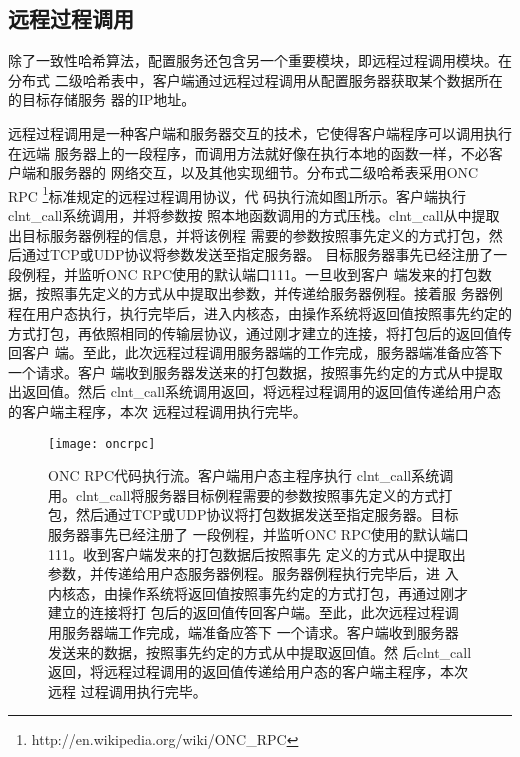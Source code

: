\subsection{远程过程调用}
除了一致性哈希算法，配置服务还包含另一个重要模块，即远程过程调用模块。在分布式
二级哈希表中，客户端通过远程过程调用从配置服务器获取某个数据所在的目标存储服务
器的IP地址。

远程过程调用是一种客户端和服务器交互的技术，它使得客户端程序可以调用执行在远端
服务器上的一段程序，而调用方法就好像在执行本地的函数一样，不必客户端和服务器的
网络交互，以及其他实现细节。分布式二级哈希表采用ONC RPC
\footnote{http://en.wikipedia.org/wiki/ONC\_RPC}标准规定的远程过程调用协议，代
码执行流如图\ref{figure:oncrpc}所示。客户端执行clnt\_call系统调用，并将参数按
照本地函数调用的方式压栈。clnt\_call从中提取出目标服务器例程的信息，并将该例程
需要的参数按照事先定义的方式打包，然后通过TCP或UDP协议将参数发送至指定服务器。
目标服务器事先已经注册了一段例程，并监听ONC RPC使用的默认端口111。一旦收到客户
端发来的打包数据，按照事先定义的方式从中提取出参数，并传递给服务器例程。接着服
务器例程在用户态执行，执行完毕后，进入内核态，由操作系统将返回值按照事先约定的
方式打包，再依照相同的传输层协议，通过刚才建立的连接，将打包后的返回值传回客户
端。至此，此次远程过程调用服务器端的工作完成，服务器端准备应答下一个请求。客户
端收到服务器发送来的打包数据，按照事先约定的方式从中提取出返回值。然后
clnt\_call系统调用返回，将远程过程调用的返回值传递给用户态的客户端主程序，本次
远程过程调用执行完毕。
\begin{figure}
  \centering
  \texttt{[image: oncrpc]}
  \caption[ONC RPC代码执行流]{ONC RPC代码执行流。客户端用户态主程序执行
  clnt\_call系统调用。clnt\_call将服务器目标例程需要的参数按照事先定义的方式打
  包，然后通过TCP或UDP协议将打包数据发送至指定服务器。目标服务器事先已经注册了
  一段例程，并监听ONC RPC使用的默认端口111。收到客户端发来的打包数据后按照事先
  定义的方式从中提取出参数，并传递给用户态服务器例程。服务器例程执行完毕后，进
  入内核态，由操作系统将返回值按照事先约定的方式打包，再通过刚才建立的连接将打
  包后的返回值传回客户端。至此，此次远程过程调用服务器端工作完成，端准备应答下
  一个请求。客户端收到服务器发送来的数据，按照事先约定的方式从中提取返回值。然
  后clnt\_call返回，将远程过程调用的返回值传递给用户态的客户端主程序，本次远程
  过程调用执行完毕。}
  \label{figure:oncrpc}
\end{figure}


